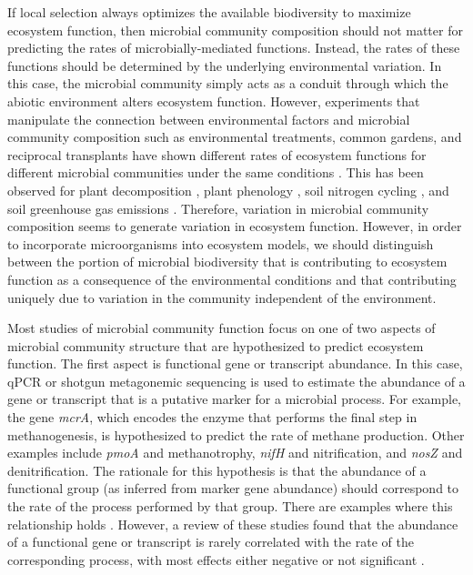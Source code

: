 \documentclass{article}
\begin{document}
If local selection always optimizes the available biodiversity to maximize
ecosystem function, then microbial community composition should not matter for
predicting the rates of microbially-mediated functions. Instead, 
the rates of these functions should be determined by the
underlying environmental variation. In this case, the microbial community simply
acts as a conduit through which the abiotic
environment alters ecosystem function. However, experiments that manipulate the
connection between environmental factors and microbial community composition
such as environmental treatments, common gardens, and reciprocal transplants
have shown different rates of ecosystem functions for different microbial
communities under the same conditions \citep{reed2007}. 
This has been observed for plant decomposition
\citep{strickland2009}, plant phenology \citep{panke-buisse2015}, soil nitrogen
cycling \citep{balser2005}, and soil greenhouse gas emissions
\citep{cavigelli2000}. Therefore, variation in microbial community composition
seems to generate variation in ecosystem function. However, in order to
incorporate microorganisms into ecosystem models, 
we should distinguish between the portion
of microbial biodiversity that is contributing to ecosystem function as a
consequence of the environmental conditions and that contributing uniquely due to
variation in the community independent of the environment. 

Most studies of microbial community function focus on one of two aspects of
microbial community structure that are hypothesized to predict
ecosystem function. The first aspect is functional gene or transcript abundance.
In this case, qPCR or shotgun metagonemic sequencing is used to estimate the
abundance of a gene
or transcript that is a putative marker for a microbial process. For example,
the gene \textit{mcrA}, which encodes the enzyme that performs the final step in
methanogenesis, is hypothesized to predict the rate of
methane production. Other examples include \textit{pmoA} and methanotrophy,
\textit{nifH} and nitrification, and \textit{nosZ} and denitrification. The
rationale for this hypothesis is that the abundance of a functional group (as
inferred from marker gene abundance) should correspond to the rate of the
process performed by that group. There are examples where this relationship
holds \citep{freitag2009, freitag2010, schnyder2018}. However, a review of these
studies found that the abundance of a functional gene or transcript is rarely
correlated with the rate of the corresponding process, with most effects either
negative or not significant \citep{rocca2015}.
\end{document}

